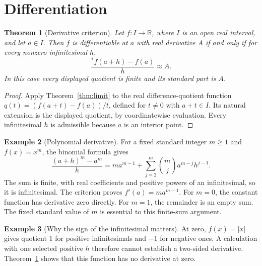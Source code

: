 \documentclass[11pt]{article}
\newtheorem{theorem}{Theorem}[section]
\theoremstyle{definition}
\newtheorem{example}[theorem]{Example}
\theoremstyle{remark}
\newcommand{\RR}{\mathbb R}
\newcommand{\ext}[1]{{}^{*}\!#1}
\begin{document}
\section{Differentiation}
\begin{theorem}[Derivative criterion]\label{thm:derivative}
Let \(f:I\to\RR\), where \(I\) is an open real interval, and let \(a\in I\).
Then \(f\) is differentiable at \(a\) with real derivative \(A\) if and only if
for every nonzero infinitesimal \(h\),
\[
\frac{\ext f(a+h)-f(a)}{h}\approx A.
\]
In this case every displayed quotient is finite and its standard part is \(A\).
\end{theorem}
\begin{proof}
Apply Theorem~\ref{thm:limit} to the real difference-quotient function
\(q(t)=(f(a+t)-f(a))/t\), defined for \(t\ne0\) with \(a+t\in I\).
Its natural extension is the displayed quotient, by coordinatewise evaluation.
Every infinitesimal \(h\) is admissible because \(a\) is an interior point.
\end{proof}
\begin{example}[Polynomial derivative]\label{ex:polynomial}
For a fixed standard integer \(m\ge1\) and \(f(x)=x^m\), the binomial formula gives
\[
\frac{(a+h)^m-a^m}{h}
=ma^{m-1}+\sum_{j=2}^m\binom mj a^{m-j}h^{j-1}.
\]
The sum is finite, with real coefficients and positive powers of an infinitesimal,
so it is infinitesimal. The criterion proves \(f'(a)=ma^{m-1}\).
For \(m=0\), the constant function has derivative zero directly.
For \(m=1\), the remainder is an empty sum. The fixed standard value of \(m\)
is essential to this finite-sum argument.
\end{example}
\begin{example}[Why the sign of the infinitesimal matters]\label{ex:abs}
At zero, \(f(x)=|x|\) gives quotient \(1\) for positive infinitesimals and \(-1\)
for negative ones. A calculation with one selected positive \(h\) therefore
cannot establish a two-sided derivative. Theorem~\ref{thm:derivative} shows
that this function has no derivative at zero.
\end{example}
\end{document}
